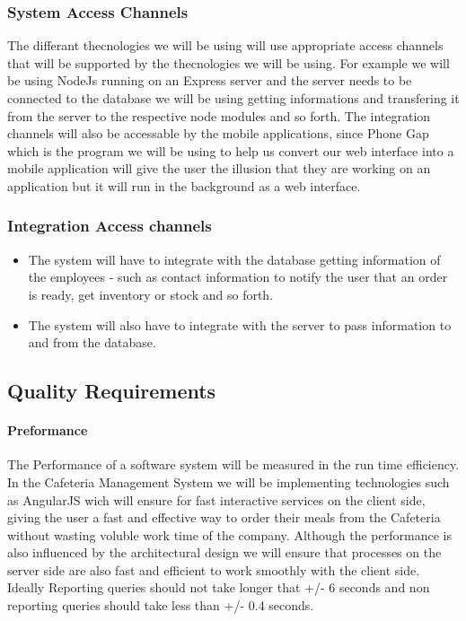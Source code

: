 \documentclass[12pt]{article}
\begin{document}
\subsubsection{System Access Channels}
The differant thecnologies we will be using will use appropriate access channels that will be supported by the thecnologies we will be using. For example we will be using NodeJs running on an Express server and the server needs to be connected to the database we will be using getting informations and transfering it from the server to the respective node modules and so forth. 
The integration channels will also be accessable by the mobile applications, since Phone Gap which is the program we will be using to help us convert our web interface into a mobile application will give the user the illusion that they are working on an application but it will run in the background as a web interface. 

\subsubsection{Integration Access channels}

\begin{itemize}

\item The system will have to integrate with the database getting information of the employees - such as contact information to notify the user that an order is ready, get inventory or stock and so forth. 

\item The system will also have to integrate with the server to pass information to and from the database.
\end{itemize}




\subsection{Quality Requirements}

\paragraph{ Preformance\\}
The Performance of a software system will be measured in the run time efficiency.  In the Cafeteria Management System we will be implementing technologies such as AngularJS wich will ensure for fast interactive services on the client side, giving the user a fast and effective way to order their meals from the Cafeteria without wasting voluble work time of the company.  Although the performance is also influenced by the architectural design we will ensure that processes on the server side are also fast and efficient to work smoothly with the client side. Ideally Reporting queries should not take longer that +/- 6 seconds and non reporting queries should take less than +/- 0.4 seconds. 
\end{document}
